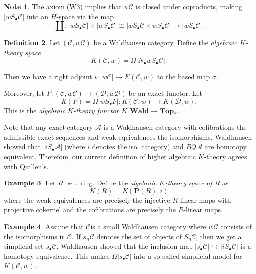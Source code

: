 \documentclass[10pt,letterpaper,cm]{nupset}
\theoremstyle{definition}
\newtheorem{definition}{Definition}
\newtheorem{exmp}[definition]{Example}
\newtheorem{note}[definition]{Note}
\theoremstyle{theorem}
\theoremstyle{remark}
\renewcommand{\P}{\mathbf P}
\newcommand{\1}{\mathbf{1}}
\renewcommand{\a}{\mathscr{A}}
\renewcommand{\c}{\mathscr{C}}
\renewcommand{\d}{\mathscr{D}}
\newcommand{\0}{\vec 0}
\begin{document}
\begin{note}
The axiom (W3) implies that $w{\c}$ is closed under coproducts, making $\left\lvert{wS_{\bullet} \c}\right\rvert$ into an $H$-space via the map $$\coprod: \left\lvert{wS_{\bullet} \c}\right\rvert \times \left\lvert{wS_{\bullet} \c}\right\rvert \cong \left\lvert{wS_{\bullet} \c \times  wS_{\bullet} \c}\right\rvert\to \left\lvert{wS_{\bullet} \c}\right\rvert.$$
\end{note}

\begin{definition}
Let $\left(\c, w{\c}\right)$ be a Waldhausen category. Define the \textit{algebraic $K$-theory space} $$K(\c, w) = \Omega \left\lvert{ N_{\bullet} wS_{\bullet} \c}\right\rvert.$$ 
\end{definition}

Then we have a right adjoint $\iota: \left\lvert{w{\c}}\right\rvert \to K(\c, w)$ to the based map $\sigma$.

\medskip

 Moreover,
let $F : \left(\c, w{\c}\right) \to \left(\d, w{\d}\right)$ be an exact functor. Let $$K(F) = \Omega\left\lvert{wS_{\bullet}F}\right\rvert : K(\c, w) \to K(\d, w).$$ This is the \textit{algebraic $K$-theory functor} $K : \mathbf{Wald} \to \mathbf{Top_{\ast}}.$

\medskip

Note that any exact category $\a$ is a Waldhausen category with cofibrations the admissible exact sequences and weak equivalences the isomorphisms. Waldhausen showed that $\left\lvert{iS_{\bullet}\a}\right\rvert$ (where $i$ denotes the iso. category) and $BQ\a$ are homotopy equivalent. Therefore, our current definition of higher algebraic $K$-theory agrees with Quillen's.


\begin{exmp}
Let $R$ be a ring. Define the \textit{algebraic $K$-theory space of $R$} as $$K(R) = K(\P(R), i)$$ where the weak equivalences are precisely the injective $R$-linear maps with projective cokernel and the cofibrations are precisely the $R$-linear maps.
\end{exmp}

\begin{exmp}
Assume that $\c$is a small Waldhausen category where $w{\c}$ consists of the isomorphisms in $\c$. If $s_n\c$ denotes the set of objects of $S_n \c$, then we get a simplicial set $s_{\bullet} \c$. Waldhausen showed that the inclusion map $\left\lvert{s_{\bullet} \c}\right\rvert \hookrightarrow \left\lvert{iS_{\bullet} \c}\right\rvert$ is a homotopy equivalence. This makes $\Omega |s_{\bullet} \c|$ into a so-called simplicial model for $K(\c, w)$.
\end{exmp}
\end{document}
